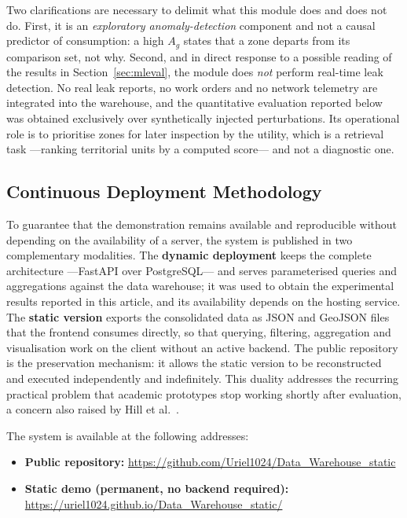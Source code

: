 \documentclass[runningheads]{llncs}
\renewcommand{\_}{\origunderscore\allowbreak}
\newif\ifshowchanges
\newcommand{\new}[1]{\ifshowchanges\textcolor{chg}{#1}\else#1\fi}
\newenvironment{chgblock}{\ifshowchanges\color{chg}\fi}{}
\begin{document}
\begin{chgblock}
Two clarifications are necessary to delimit what this module does and does not
do. First, it is an \emph{exploratory anomaly-detection} component and not a
causal predictor of consumption: a high $A_g$ states that a zone departs from its
comparison set, not why. Second, and in direct response to a possible reading of
the results in Section~\ref{sec:mleval}, the module does \emph{not} perform
real-time leak detection. No real leak reports, no work orders and no network
telemetry are integrated into the warehouse, and the quantitative evaluation
reported below was obtained exclusively over synthetically injected
perturbations. Its operational role is to prioritise zones for later inspection
by the utility, which is a retrieval task ---ranking territorial units by a
computed score--- and not a diagnostic one.
\end{chgblock}

\subsection{Continuous Deployment Methodology}
\label{sec:deploy}

To guarantee that the demonstration remains available and reproducible without
depending on the availability of a server, the system is published in two
complementary modalities. The \textbf{dynamic deployment} keeps the complete
architecture ---FastAPI over PostgreSQL--- and serves parameterised queries and
aggregations against the data warehouse; it was used to obtain the experimental
results reported in this article, and its availability depends on the hosting
service. The \textbf{static version} exports the consolidated data as JSON and
GeoJSON files that the frontend consumes directly, so that querying, filtering,
aggregation and visualisation work on the client without an active backend. The
public repository is the preservation mechanism: it allows the static version to
be reconstructed and executed independently and indefinitely. \new{This duality addresses the recurring practical
problem that academic prototypes stop working shortly after evaluation, a concern
also raised by Hill et al.~\cite{hill2023}.}

The system is available at the following addresses:
\begin{itemize}\setlength{\itemsep}{1pt}
    \item \textbf{Public repository:} \new{\url{https://github.com/Uriel1024/Data_Warehouse_static}}
    \item \textbf{Static demo (permanent, no backend required):} \new{\url{https://uriel1024.github.io/Data_Warehouse_static/}}
\end{itemize}
\end{document}
